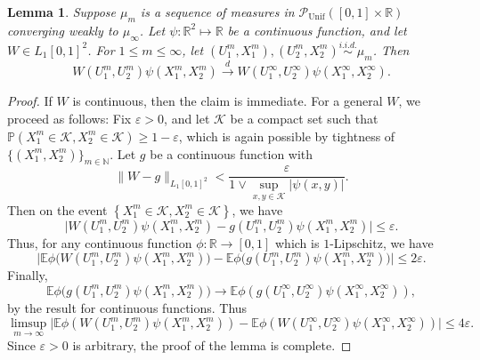 \documentclass[11pt,reqno]{amsart}
\numberwithin{equation}{section}
\newtheorem{lemma}[theorem]{Lemma}
\theoremstyle{definition}
\def\E{{\mathbb E}}
\def\R{{\mathbb R}}
\def\N{{\mathbb N}}
\def\PP{{\mathbb P}}
\def\P{{\mathcal P}}
\def\Punif{\P_{\mathrm{Unif}}([0,1] \times \R)}
\begin{document}
\begin{lemma} \label{lem: TfW weak conv}
	Suppose $\mu_m$ is a sequence of measures in $\Punif$ converging weakly to $\mu_\infty$. Let $\psi:\R^2\mapsto\R$ be a continuous function, and let $W\in L_1[0,1]^2$. For $1\le m\le \infty$, let $(U^m_1,X^m_1),(U^m_2,X^m_2)\stackrel{i.i.d.}{\sim} \mu_m$. Then
	\begin{equation*}
		W(U^m_1,U^m_2) \psi(X^m_1, X^m_2) \stackrel{d}{\to} W(U^\infty_1,U^\infty_2) \psi(X^\infty_1,X^\infty_2). 
	\end{equation*}
\end{lemma}
\begin{proof}
	If $W$ is continuous, then the claim is immediate.
	For a general $W$, we proceed as follows:	
	Fix $\varepsilon>0$, and let $\mathcal{K}$ be a compact set such that $\PP(X^m_1\in \mathcal{K}, X^m_2\in \mathcal{K})\ge 1-\varepsilon$, which is again possible by tightness of $ \{\left(X^m_1, X^m_2\right)\}_{m \in \N} $. Let $g$ be a continuous function with  \[\|W-g\|_{L_1[0,1]^2}<\frac{\varepsilon}{1 \vee \sup_{x,y\in \mathcal{K}}|\psi(x,y)|}.\]  Then on the event $\left\{X^m_1\in \mathcal{K}, X^m_2\in \mathcal{K}\right\}$, we have
	\begin{equation*}
 \Big|W(U^m_1,U^m_2)\psi(X^m_1, X^m_2)-g(U^m_1,U^m_2)\psi(X^m_1, X^m_2) \Big|\le \varepsilon. 
	\end{equation*}
	Thus, for any continuous function $\phi:\mathbb{R} \to [0,1]$ which is $1$-Lipschitz, we have
	\begin{equation*}
		\Big|\E \phi\big(W(U^m_1,U^m_2)\psi(X^m_1, X^m_2)\big)-\E \phi\big(g(U^m_1,U^m_2)\psi(X^m_1, X^m_2)\big) \Big|\le 2\varepsilon.
	\end{equation*}
	Finally,
	\begin{equation*}
	\E \phi\big(g(U^m_1,U^m_2)\psi(X^m_1, X^m_2)\big)\to \E \phi(g(U^\infty_1,U^\infty_2)\psi(X^\infty_1, X^\infty_2)),
	\end{equation*}
	by the result for continuous functions. Thus
	\begin{equation*}
	\limsup_{m\to\infty}\Big|\E \phi(W(U^m_1,U^m_2)\psi(X^m_1, X^m_2))-\E \phi(W(U^\infty_1,U^\infty_2)\psi(X^\infty_1, X^\infty_2))\Big|\le 4\varepsilon.
	\end{equation*}
	Since $\varepsilon > 0$ is arbitrary, the proof of the lemma is complete.
\end{proof}



\end{document}
